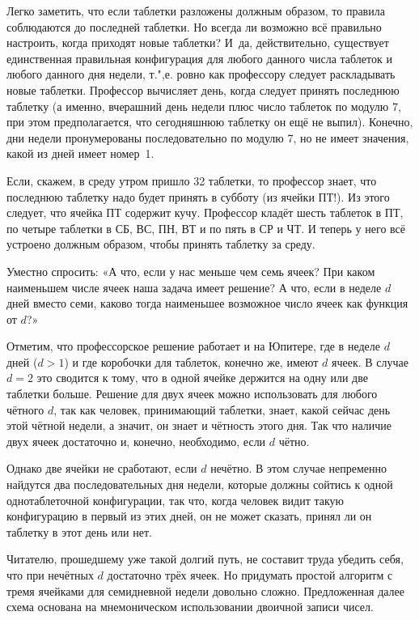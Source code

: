\documentclass[twoside]{book}
\begin{document}
Легко заметить, что если таблетки разложены должным образом, то правила соблюдаются до последней таблетки.
Но всегда ли возможно всё правильно настроить, когда приходят новые таблетки?
И~да, действительно, существует единственная правильная конфигурация для любого данного числа таблеток и любого данного дня недели, т.",е. ровно как профессору следует раскладывать новые таблетки.
Профессор вычисляет день, когда следует принять последнюю таблетку (а именно, вчерашний день недели плюс число таблеток по модулю 7, при этом
предполагается, что сегодняшнюю таблетку он ещё не выпил).
Конечно, дни недели пронумерованы последовательно  по модулю 7, но не имеет значения, какой из дней имеет номер~1.

Если, скажем, в среду утром пришло 32 таблетки, то профессор знает, что последнюю таблетку надо будет принять в субботу (из ячейки ПТ!). Из этого следует, что ячейка ПТ содержит кучу.
Профессор кладёт шесть таблеток в ПТ, по четыре таблетки в СБ, ВС, ПН, ВТ и по пять в СР и ЧТ.
И теперь у него всё устроено должным образом, чтобы принять таблетку за среду.
\heart

Уместно спросить:
«А что, если у нас меньше чем семь ячеек?
При каком наименьшем числе ячеек наша задача имеет решение?
А что, если в неделе $d$ дней вместо семи,
каково тогда наименьшее возможное число ячеек как функция от $d$?»

Отметим, что профессорское решение работает и на Юпитере, где в неделе $d$ дней ($d>1$) и где коробочки для таблеток, конечно же, имеют $d$ ячеек.
В случае $d=2$ это сводится к тому, что в одной ячейке держится на одну или две таблетки больше.
Решение для двух ячеек можно использовать для любого чётного $d$, так как человек, принимающий таблетки, знает, какой сейчас день этой чётной недели, а значит, он знает и чётность этого дня.
Так что наличие двух ячеек достаточно и, конечно, необходимо, если $d$ чётно.

Однако две ячейки не сработают, если $d$ нечётно.
В этом случае непременно найдутся два последовательных дня недели, которые должны сойтись к одной однотаблеточной конфигурации, так что, когда человек видит такую конфигурацию в первый из этих дней, он не может сказать, принял ли он таблетку в этот день или нет.

Читателю, прошедшему уже такой долгий путь, не составит труда убедить себя, что при нечётных $d$ достаточно трёх ячеек.
Но придумать простой алгоритм с тремя ячейками для семидневной недели довольно сложно.
Предложенная далее схема основана на мнемоническом использовании двоичной записи чисел.
\end{document}
